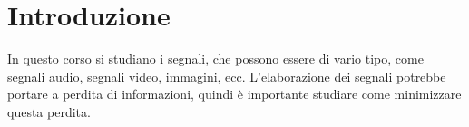 \documentclass[a4paper]{article}
\begin{document}


\tableofcontents
\pagebreak

\section{Introduzione}
In questo corso si studiano i segnali, che possono essere di vario tipo, come segnali audio,
segnali video, immagini, ecc. L'elaborazione dei segnali potrebbe portare a perdita di
informazioni, quindi è importante studiare come minimizzare questa perdita.
\end{document}
